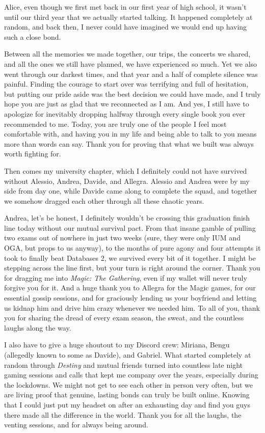 \documentclass[english, oneside]{sapthesis}
\begin{document}
\begin{acknowledgments}
Alice, even though we first met back in our first year of high school, it wasn't until our third year that we actually started talking. It happened completely at random, and back then, I never could have imagined we would end up having such a close bond.

Between all the memories we made together, our trips, the concerts we shared, and all the ones we still have planned, we have experienced so much. Yet we also went through our darkest times, and that year and a half of complete silence was painful. Finding the courage to start over was terrifying and full of hesitation, but putting our pride aside was the best decision we could have made, and I truly hope you are just as glad that we reconnected as I am. And yes, I still have to apologize for inevitably dropping halfway through every single book you ever recommended to me. Today, you are truly one of the people I feel most comfortable with, and having you in my life and being able to talk to you means more than words can say. Thank you for proving that what we built was always worth fighting for.
\medskip

Then comes my university chapter, which I definitely could not have survived without Alessio, Andrea, Davide, and Allegra. Alessio and Andrea were by my side from day one, while Davide came along to complete the squad, and together we somehow dragged each other through all these chaotic years.

Andrea, let's be honest, I definitely wouldn't be crossing this graduation finish line today without our mutual survival pact. From that insane gamble of pulling two exams out of nowhere in just two weeks (sure, they were only IUM and OGA, but props to us anyway), to the months of pure agony and four attempts it took to finally beat Databases 2, we survived every bit of it together. I might be stepping across the line first, but your turn is right around the corner. Thank you for dragging me into \textit{Magic: The Gathering}, even if my wallet will never truly forgive you for it. And a huge thank you to Allegra for the Magic games, for our essential gossip sessions, and for graciously lending us your boyfriend and letting us kidnap him and drive him crazy whenever we needed him. To all of you, thank you for sharing the dread of every exam season, the sweat, and the countless laughs along the way.

\medskip

I also have to give a huge shoutout to my Discord crew: Miriana, Bengu (allegedly known to some as Davide), and Gabriel. What started completely at random through \textit{Destiny} and mutual friends turned into countless late night gaming sessions and calls that kept me company over the years, especially during the lockdowns. We might not get to see each other in person very often, but we are living proof that genuine, lasting bonds can truly be built online. Knowing that I could just put my headset on after an exhausting day and find you guys there made all the difference in the world. Thank you for all the laughs, the venting sessions, and for always being around.


\end{acknowledgments}
\end{document}
